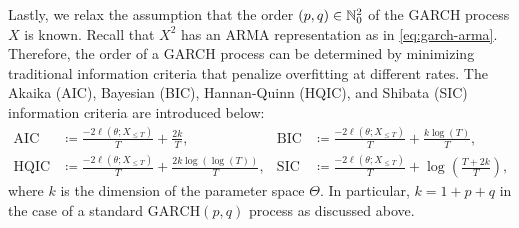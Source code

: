 Lastly, we relax the assumption that the order $(p,q)\in\mathbb{N}_{0}^{2}$ of the GARCH process $X$ is known. Recall that $X^{2}$ has an ARMA representation as in \eqref{eq:garch-arma}. Therefore, the order of a GARCH process can be determined by minimizing traditional information criteria that penalize overfitting at different rates. The Akaika (AIC), Bayesian (BIC), Hannan-Quinn (HQIC), and Shibata (SIC) information criteria are introduced below:
\begin{align*}
    \mathrm{AIC}&\coloneqq\frac{-2\ell(\theta;X_{\leq T})}{T}+\frac{2k}{T},&\mathrm{BIC}&\coloneqq\frac{-2\ell(\theta;X_{\leq T})}{T}+\frac{k\log(T)}{T},\\
    \mathrm{HQIC}&\coloneqq\frac{-2\ell(\theta;X_{\leq T})}{T}+\frac{2k\log(\log(T))}{T},&\mathrm{SIC}&\coloneqq\frac{-2\ell(\theta;X_{\leq T})}{T}+\log\left(\frac{T+2k}{T}\right),
\end{align*}
where $k$ is the dimension of the parameter space $\Theta$. In particular, $k=1+p+q$ in the case of a standard $\mathrm{GARCH}(p,q)$ process as discussed above.



